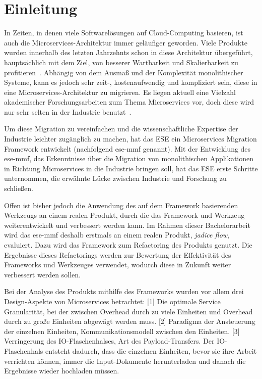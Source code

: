 \chapter{Einleitung}
\label{chap:einleitung}

In Zeiten, in denen viele Softwarelösungen auf Cloud-Computing basieren, ist auch die Microservices-Architektur immer geläufiger geworden.
Viele Produkte wurden innerhalb des letzten Jahrzehnts schon in diese Architektur übergeführt, hauptsächlich mit dem Ziel, von besserer Wartbarkeit und Skalierbarkeit zu profitieren~\cite{Fritzsch_2019}.
Abhängig von dem Ausmaß und der Komplexität monolithischer Systeme, kann es jedoch sehr zeit-, kostenaufwendig und kompliziert sein, diese in eine Microservices-Architektur zu migrieren.
Es liegen aktuell eine Vielzahl akademischer Forschungsarbeiten zum Thema Microservices vor, doch diese wird nur sehr selten in der Industrie benutzt~\cite{fritzsch2022architecturecentric}.

Um diese Migration zu vereinfachen und die wissenschaftliche Expertise der Industrie leichter zugänglich zu machen, hat das ESE ein Microservices Migration Framework entwickelt (nachfolgend \acrshort{ese-mmf} genannt).
Mit der Entwicklung des \acrshort{ese-mmf}, das Erkenntnisse über die Migration von monolithischen Applikationen in Richtung Microservices in die Industrie bringen soll, hat das ESE erste Schritte unternommen, die erwähnte Lücke zwischen Industrie und Forschung zu schließen.

Offen ist bisher jedoch die Anwendung des auf dem Framework basierenden Werkzeugs an einem realen Produkt, durch die das Framework und Werkzeug weiterentwickelt und verbessert werden kann.
Im Rahmen dieser Bachelorarbeit wird das \acrshort{ese-mmf} deshalb erstmals an einem realen Produkt, \emph{jadice flow}, evaluiert.
Dazu wird das Framework zum Refactoring des Produkts genutzt.
Die Ergebnisse dieses Refactorings werden zur Bewertung der Effektivität des Frameworks und Werkzeuges verwendet, wodurch diese in Zukunft weiter verbessert werden sollen.

Bei der Analyse des Produkts mithilfe des Frameworks wurden vor allem drei Design-Aspekte von Microservices betrachtet:
[1] Die optimale Service Granularität, bei der zwischen Overhead durch zu viele Einheiten und Overhead durch zu große Einheiten abgewägt werden muss.
[2] Paradigma der Ansteuerung der einzelnen Einheiten, Kommunikationsmodell zwischen den Einheiten.
[3] Verringerung des IO-Flaschenhalses, Art des Payload-Transfers.
Der IO-Flaschenhals entsteht dadurch, dass die einzelnen Einheiten, bevor sie ihre Arbeit verrichten können, immer die Input-Dokumente herunterladen und danach die Ergebnisse wieder hochladen müssen.


